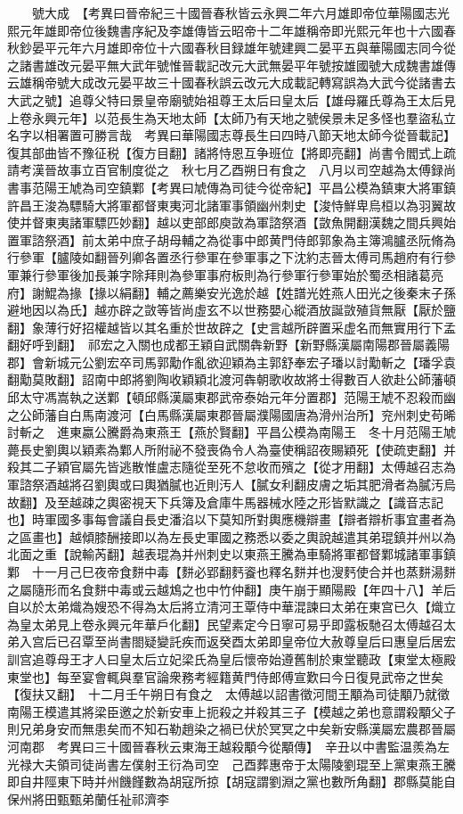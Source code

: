 　　號大成　【考異曰晉帝紀三十國晉春秋皆云永興二年六月雄即帝位華陽國志光熙元年雄即帝位後魏書序紀及李雄傳皆云昭帝十二年雄稱帝即光熙元年也十六國春秋鈔晏平元年六月雄即帝位十六國春秋目録雄年號建興二晏平五與華陽國志同今從之諸書雄改元晏平無大武年號惟晉載記改元大武無晏平年號按雄國號大成魏書雄傳云雄稱帝號大成改元晏平故三十國春秋誤云改元大成載記轉寫誤為大武今從諸書去大武之號】追尊父特曰景皇帝廟號始祖尊王太后曰皇太后【雄母羅氏尊為王太后見上卷永興元年】以范長生為天地太師【太師乃有天地之號侯景未足多怪也羣盜私立名字以相署置可勝言哉　考異曰華陽國志尊長生曰四時八節天地太師今從晉載記】復其部曲皆不豫征税【復方目翻】諸將恃恩互争班位【將即亮翻】尚書令閻式上疏請考漢晉故事立百官制度從之　秋七月乙酉朔日有食之　八月以司空越為太傅録尚書事范陽王虓為司空鎮鄴【考異曰虓傳為司徒今從帝紀】平昌公模為鎮東大將軍鎮許昌王浚為驃騎大將軍都督東夷河北諸軍事領幽州刺史【浚恃鮮卑烏桓以為羽翼故使并督東夷諸軍驃匹妙翻】越以吏部郎庾敳為軍諮祭酒【敳魚開翻漢魏之間兵興始置軍諮祭酒】前太弟中庶子胡母輔之為從事中郎黄門侍郎郭象為主簿鴻臚丞阮脩為行參軍【臚陵如翻晉列卿各置丞行參軍在參軍事之下沈約志晉太傅司馬趙府有行參軍兼行參軍後加長兼字除拜則為參軍事府板則為行參軍行參軍始於蜀丞相諸葛亮府】謝鯤為掾【掾以絹翻】輔之薦樂安光逸於越【姓譜光姓燕人田光之後秦末子孫避地因以為氏】越亦辟之敳等皆尚虛玄不以世務嬰心縱酒放誕敳殖貨無厭【厭於鹽翻】象薄行好招權越皆以其名重於世故辟之【史言越所辟置采虚名而無實用行下孟翻好呼到翻】　祁宏之入關也成都王穎自武關犇新野【新野縣漢屬南陽郡晉屬義陽郡】會新城元公劉宏卒司馬郭勱作亂欲迎穎為主郭舒奉宏子璠以討勱斬之【璠孚袁翻勱莫敗翻】詔南中郎將劉陶收穎穎北渡河犇朝歌收故將士得數百人欲赴公師藩頓邱太守馮嵩執之送鄴【頓邱縣漢屬東郡武帝泰始元年分置郡】范陽王虓不忍殺而幽之公師藩自白馬南渡河【白馬縣漢屬東郡晉屬濮陽國唐為滑州治所】兖州刺史苟晞討斬之　進東嬴公騰爵為東燕王【燕於賢翻】平昌公模為南陽王　冬十月范陽王虓薨長史劉輿以穎素為鄴人所附祕不發喪偽令人為臺使稱詔夜賜穎死【使疏吏翻】并殺其二子穎官屬先皆逃散惟盧志隨從至死不怠收而殯之【從才用翻】太傅越召志為軍諮祭酒越將召劉輿或曰輿猶膩也近則汚人【膩女利翻皮膚之垢其肥滑者為膩汚烏故翻】及至越疎之輿密視天下兵簿及倉庫牛馬器械水陸之形皆默識之【識音志記也】時軍國多事每會議自長史潘淊以下莫知所對輿應機辯畫【辯者辯析事宜畫者為之區畫也】越傾膝酬接即以為左長史軍國之務悉以委之輿說越遣其弟琨鎮并州以為北面之重【說輸芮翻】越表琨為并州刺史以東燕王騰為車騎將軍都督鄴城諸軍事鎮鄴　十一月己巳夜帝食䴵中毒【䴵必郢翻麫餈也釋名䴵并也溲麫使合并也蒸䴵湯䴵之屬隨形而名食䴵中毒或云越鴆之也中竹仲翻】庚午崩于顯陽殿【年四十八】羊后自以於太弟熾為嫂恐不得為太后將立清河王覃侍中華混諫曰太弟在東宫已久【熾立為皇太弟見上卷永興元年華戶化翻】民望素定今日寧可易乎即露板馳召太傅越召太弟入宫后已召覃至尚書閤疑變託疾而返癸酉太弟即皇帝位大赦尊皇后曰惠皇后居宏訓宫追尊母王才人曰皇太后立妃梁氏為皇后懷帝始遵舊制於東堂聽政【東堂太極殿東堂也】每至宴會輒與羣官論衆務考經籍黄門侍郎傅宣歎曰今日復見武帝之世矣【復扶又翻】　十二月壬午朔日有食之　太傅越以詔書徵河間王顒為司徒顒乃就徵南陽王模遣其將梁臣邀之於新安車上扼殺之并殺其三子【模越之弟也意謂殺顒父子則兄弟身安而無患矣而不知石勒趙染之禍已伏於冥冥之中矣新安縣漢屬宏農郡晉屬河南郡　考異曰三十國晉春秋云東海王越殺顒今從顒傳】　辛丑以中書監温羨為左光禄大夫領司徒尚書左僕射王衍為司空　己酉葬惠帝于太陽陵劉琨至上黨東燕王騰即自井陘東下時并州饑饉數為胡寇所掠【胡寇謂劉淵之黨也數所角翻】郡縣莫能自保州將田甄甄弟蘭任祉祁濟李
